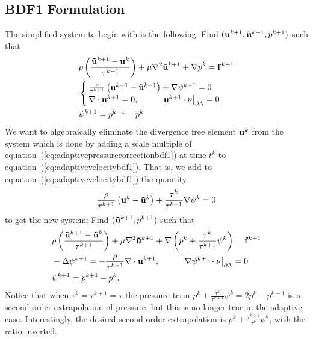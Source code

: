 \documentclass[letterpaper]{erdc}
\begin{document}
\subsection{BDF1 Formulation} The simplified system to begin with is the
following: Find $(\textbf{u}^{k+1},\mathbf{\tilde{u}}^{k+1},p^{k+1})$ such that
\begin{align}
  &\rho\left( \frac{\mathbf{\tilde{u}}^{k+1} - \textbf{u}^{k}}{\tau^{k+1}} \right) + \mu\nabla^2 \mathbf{\tilde{u}}^{k+1} + \nabla p^{k} = \mathbf{f}^{k+1}\label{eq:adaptivevelocitybdf1}\\
  &\begin{cases}
    \frac{\rho}{\tau^{k+1}}\left( \textbf{u}^{k+1}-\mathbf{\tilde{u}}^{k+1}\right) + \nabla\psi^{k+1} = 0\\
    \nabla\cdot\textbf{u}^{k+1} = 0, \hspace{1cm} \left.\textbf{u}^{k+1}\cdot\nu\right|_{\partial\Lambda}=0
    \end{cases}\label{eq:adaptivepressurecorrectionbdf1}\\
  & \psi^{k+1} = p^{k+1} - p^{k}
\end{align}
We want to algebraically eliminate the divergence free element $\textbf{u}^{k}$ from
the system which is done by adding a scale multiple of
equation~(\ref{eq:adaptivepressurecorrectionbdf1}) at time $t^{k}$ to
equation~(\ref{eq:adaptivevelocitybdf1}).  That is, we add to
equation~(\ref{eq:adaptivevelocitybdf1}) the quantity
\begin{equation*}
  \frac{\rho}{\tau^{k+1}}\left( \textbf{u}^{k} - \mathbf{\tilde{u}}^{k} \right) + \frac{\tau^{k}}{\tau^{k+1}}\nabla\psi^{k} = 0
\end{equation*}
to get the new system:  Find $(\mathbf{\tilde{u}}^{k+1},p^{k+1})$ such that
\begin{align}
  &\rho\left( \frac{\mathbf{\tilde{u}}^{k+1} - \mathbf{\tilde{u}}^{k}}{\tau^{k+1}} \right) + \mu\nabla^2 \mathbf{\tilde{u}}^{k+1} + \nabla\left( p^{k} + \frac{\tau^{k}}{\tau^{k+1}}\psi^{k}\right) = \mathbf{f}^{k+1}\label{eq:newadaptivevelocitybdf1}\\
  &-\Delta \psi^{k+1} = -\frac{\rho}{\tau^{k+1}}\nabla\cdot\textbf{u}^{k+1}, \hspace{1cm} \left.\nabla\psi^{k+1}\cdot\nu\right|_{\partial\Lambda} = 0 \label{eq:newadaptivepressurecorrectionbdf1}\\
  & \psi^{k+1} = p^{k+1} - p^{k}.
\end{align}
Notice that when $\tau^{k}=\tau^{k+1}=\tau$ the pressure term
$p^{k} + \frac{\tau^{k}}{\tau^{k+1}}\psi^{k} = 2p^{k}-p^{k-1}$ is a second
order extrapolation of pressure, but this is no longer true in the adaptive
case.  Interestingly, the desired second order extrapolation is
$p^{k} + \frac{\tau^{k+1}}{\tau^{k}}\psi^{k}$, with the ratio inverted.
\end{document}
